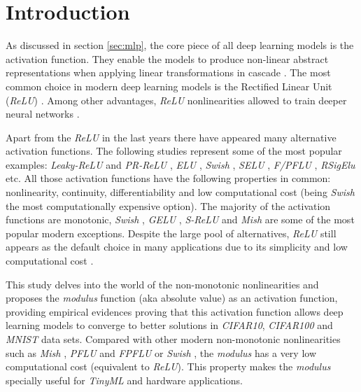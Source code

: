 \section{Introduction}
As discussed in section \ref{sec:mlp}, the core piece of all deep learning models is the activation function. They enable the models to produce non-linear abstract representations when applying linear transformations in cascade \autocite{Goodfellow2016}. The most common choice in modern deep learning models is the Rectified Linear Unit (\textit{ReLU}) \autocite{nair2010}. Among other advantages, \textit{ReLU} nonlinearities allowed to train deeper neural networks \autocite{xu2015}.

Apart from the \textit{ReLU} in the last years there have appeared many alternative activation functions. The following studies represent some of the most popular examples: \textit{Leaky-ReLU} and \textit{PR-ReLU} \autocite{xu2015}, \textit{ELU} \autocite{djork2016}, \textit{Swish} \autocite{ramachandran2018}, \textit{SELU} \autocite{klambauer2017}, \textit{F/PFLU} \autocite{zhu2020}, \textit{RSigElu} \autocite{Kilicarslan2021} etc. All those activation functions have the following properties in common: nonlinearity, continuity, differentiability and low computational cost (being \textit{Swish} the most computationally expensive option). The majority of the activation functions are monotonic, \textit{Swish} \autocite{ramachandran2018}, \textit{GELU} \autocite{hendrycks2016},  \textit{S-ReLU} \autocite{Jin2016} and \textit{Mish} \autocite{misra2019mish} are some of the most popular modern exceptions. Despite the large pool of alternatives, \textit{ReLU} still appears as the default choice in many applications due to its simplicity and low computational cost \autocite{nair2010}.

This study delves into the world of the non-monotonic nonlinearities and proposes the \textit{modulus} function (aka absolute value) as an activation function, providing empirical evidences  proving that this activation function allows deep learning models to converge to better solutions in \textit{CIFAR10}, \textit{CIFAR100} and \textit{MNIST} data sets. Compared with other modern non-monotonic nonlinearities such as \textit{Mish} \autocite{misra2019mish}, \textit{PFLU} and \textit{FPFLU} \autocite{zhu2020} or \textit{Swish}  \autocite{ramachandran2018}, the \textit{modulus} has a very low computational cost (equivalent to \textit{ReLU}). This property makes the \textit{modulus} specially useful for \textit{TinyML} \autocite{sanchez2020} and hardware \autocite{Misra2010} applications.

